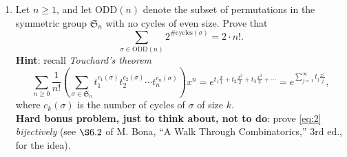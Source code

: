 \documentclass[11pt]{article}
\begin{document}
\begin{enumerate}
\item Let $n \geq 1$, and let $\mathrm{ODD}(n)$ denote the subset of permutations in the symmetric group $\mathfrak{S}_n$ with no cycles of even size. Prove that
\begin{equation}\label{eq:2}
\sum_{\sigma \in \mathrm{ODD}(n)} 2^{\#\mathrm{cycles}(\sigma)} = 2\cdot n!.
\end{equation}
{\bf Hint}: recall \emph{Touchard's theorem}
\[ \sum_{n \geq 0} \frac{1}{n!} \left(\sum_{\sigma\in \mathfrak{S}_n}t_1^{c_1(\sigma)} t_2^{c_2(\sigma)} \cdots t_n^{c_n(\sigma)} \right)  x^n = e^{t_1\frac{x}{1} + t_2\frac{x^2}{2} + t_3\frac{x^3}{3}+\cdots} = e^{\sum_{j=1}^{\infty} t_j\frac{x^j}{j}},\]
where $c_k(\sigma)$ is the number of cycles of $\sigma$ of size $k$. \\
{\bf Hard bonus problem, just to think about, not to do}: prove \eqref{eq:2} \emph{bijectively} (see $\S6.2$ of M. Bona, ``A Walk Through Combinatorics,'' 3rd ed., for the idea).


\end{enumerate}
\end{document}
